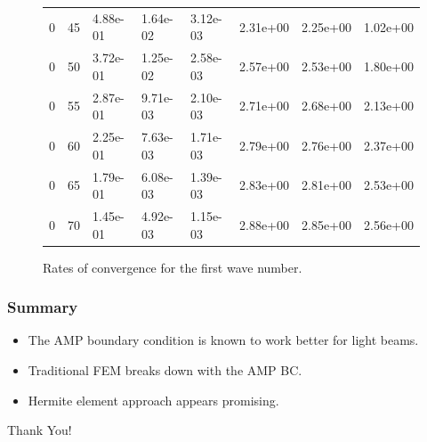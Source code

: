 \documentclass[8pt]{beamer}
\begin{document}
\begin{frame}
\begin{figure}
\begin{tabular}{| l | l | l | l | l | l | l | l |}
            0  & 45 & 4.88e-01 & 1.64e-02 & 3.12e-03 & 2.31e+00 & 2.25e+00 &
            1.02e+00                                                          \\
            0  & 50 & 3.72e-01 & 1.25e-02 & 2.58e-03 & 2.57e+00 & 2.53e+00 &
            1.80e+00                                                          \\
            0  & 55 & 2.87e-01 & 9.71e-03 & 2.10e-03 & 2.71e+00 & 2.68e+00 &
            2.13e+00                                                          \\
            0  & 60 & 2.25e-01 & 7.63e-03 & 1.71e-03 & 2.79e+00 & 2.76e+00 &
            2.37e+00                                                          \\
            0  & 65 & 1.79e-01 & 6.08e-03 & 1.39e-03 & 2.83e+00 & 2.81e+00 &
            2.53e+00                                                          \\
            0  & 70 & 1.45e-01 & 4.92e-03 & 1.15e-03 & 2.88e+00 & 2.85e+00 &
            2.56e+00                                                          \\
            \hline
        \end{tabular}

        \caption{Rates of convergence for the first wave number.}
    \end{figure}
\end{frame}

\begin{frame}
    \frametitle{Summary}
    \begin{itemize}
        \item The AMP boundary condition is known to work better for light beams.
        \item Traditional FEM breaks down with the AMP BC.
        \item Hermite element approach appears promising.
    \end{itemize}
\end{frame}

\begin{frame}
    \begin{center}
    \textcolor{RPIred}{\Huge Thank You!}
    \end{center}
\end{frame}
\end{document}
